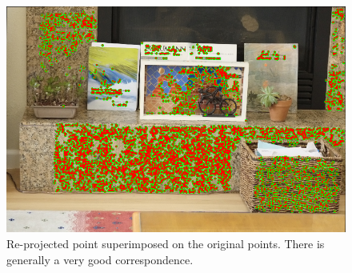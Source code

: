 \documentclass[a4paper]{article}
\begin{document}
 \begin{figure}[htb!]
    \includegraphics[width=\textwidth]{../Re-projectionPoints}
    \caption{Re-projected point superimposed on the original points.  There is generally a very good correspondence.}
    \label{fig:reproj}
\end{figure}
\FloatBarrier

\end{document}
